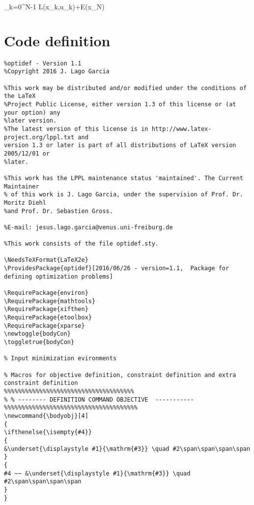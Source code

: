 \documentclass[]{report}
\begin{document}
\begin{mini!}
	{}
	{\sum_{k=0}^{N-1} L(x_k,u_k)\!\!+\!\!E(x_N)\label{OCPobj}}
	{\label{eq:OCP}}{}
\end{mini!}

\section{Code definition}
\begin{verbatim}
%optidef - Version 1.1
%Copyright 2016 J. Lago Garcia

%This work may be distributed and/or modified under the conditions of the LaTeX
%Project Public License, either version 1.3 of this license or (at your option) any 
%later version.
%The latest version of this license is in http://www.latex-project.org/lppl.txt and 
version 1.3 or later is part of all distributions of LaTeX version 2005/12/01 or 
%later.

%This work has the LPPL maintenance status 'maintained'. The Current Maintainer 
% of this work is J. Lago Garcia, under the supervision of Prof. Dr. Moritz Diehl 
%and Prof. Dr. Sebastien Gross.

%E-mail: jesus.lago.garcia@venus.uni-freiburg.de

%This work consists of the file optidef.sty.

\NeedsTeXFormat{LaTeX2e}
\ProvidesPackage{optidef}[2016/06/26 - version=1.1,  Package for defining optimization problems]

\RequirePackage{environ}
\RequirePackage{mathtools}	
\RequirePackage{xifthen}	
\RequirePackage{etoolbox}	
\RequirePackage{xparse}	
\newtoggle{bodyCon}
\toggletrue{bodyCon}

% Input minimization evironments

% Macros for objective definition, constraint definition and extra constraint definition
%%%%%%%%%%%%%%%%%%%%%%%%%%%%%%%%%%%%%
% % -------- DEFINITION COMMAND OBJECTIVE  -----------
%%%%%%%%%%%%%%%%%%%%%%%%%%%%%%%%%%%%%%
\newcommand{\bodyobj}[4]
{
\ifthenelse{\isempty{#4}}
{
&\underset{\displaystyle #1}{\mathrm{#3}} \quad #2\span\span\span\span
}
{
#4 ~~ &\underset{\displaystyle #1}{\mathrm{#3}} \quad #2\span\span\span\span
}
}



\end{verbatim}
\end{document}
